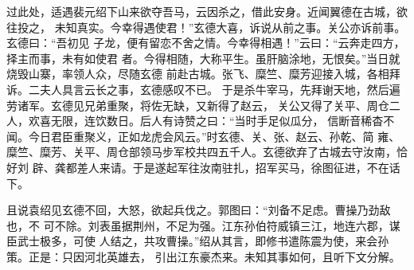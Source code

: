 过此处，适遇裴元绍下山来欲夺吾马，云因杀之，借此安身。近闻翼德在古城，欲往投之，
未知真实。今幸得遇使君！”玄德大喜，诉说从前之事。关公亦诉前事。玄德曰：“吾初见
子龙，便有留恋不舍之情。今幸得相遇！”云曰：“云奔走四方，择主而事，未有如使君
者。今得相随，大称平生。虽肝脑涂地，无恨矣。”当日就烧毁山寨，率领人众，尽随玄德
前赴古城。张飞、糜竺、糜芳迎接入城，各相拜诉。二夫人具言云长之事，玄德感叹不已。
于是杀牛宰马，先拜谢天地，然后遍劳诸军。玄德见兄弟重聚，将佐无缺，又新得了赵云，
关公又得了关平、周仓二人，欢喜无限，连饮数日。后人有诗赞之曰：“当时手足似瓜分，
信断音稀杳不闻。今日君臣重聚义，正如龙虎会风云。”时玄德、关、张、赵云、孙乾、简
雍、糜竺、糜芳、关平、周仓部领马步军校共四五千人。玄德欲弃了古城去守汝南，恰好刘
辟、龚都差人来请。于是遂起军往汝南驻扎，招军买马，徐图征进，不在话下。

且说袁绍见玄德不回，大怒，欲起兵伐之。郭图曰：“刘备不足虑。曹操乃劲敌也，不
可不除。刘表虽据荆州，不足为强。江东孙伯符威镇三江，地连六郡，谋臣武士极多，可使
人结之，共攻曹操。”绍从其言，即修书遣陈震为使，来会孙策。正是：只因河北英雄去，
引出江东豪杰来。未知其事如何，且听下文分解。